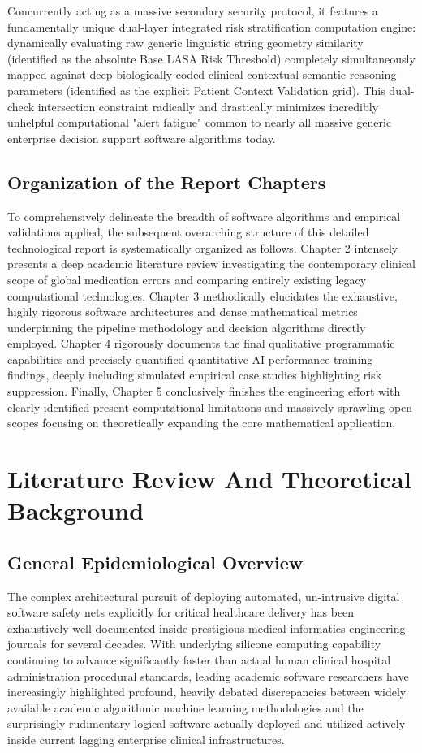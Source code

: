 \documentclass[12pt,a4paper]{report}
\begin{document}
Concurrently acting as a massive secondary security protocol, it features a fundamentally unique dual-layer integrated risk stratification computation engine: dynamically evaluating raw generic linguistic string geometry similarity (identified as the absolute Base LASA Risk Threshold) completely simultaneously mapped against deep biologically coded clinical contextual semantic reasoning parameters (identified as the explicit Patient Context Validation grid). This dual-check intersection constraint radically and drastically minimizes incredibly unhelpful computational "alert fatigue" common to nearly all massive generic enterprise decision support software algorithms today.

\section{Organization of the Report Chapters}
To comprehensively delineate the breadth of software algorithms and empirical validations applied, the subsequent overarching structure of this detailed technological report is systematically organized as follows. Chapter 2 intensely presents a deep academic literature review investigating the contemporary clinical scope of global medication errors and comparing entirely existing legacy computational technologies. Chapter 3 methodically elucidates the exhaustive, highly rigorous software architectures and dense mathematical metrics underpinning the pipeline methodology and decision algorithms directly employed. Chapter 4 rigorously documents the final qualitative programmatic capabilities and precisely quantified quantitative AI performance training findings, deeply including simulated empirical case studies highlighting risk suppression. Finally, Chapter 5 conclusively finishes the engineering effort with clearly identified present computational limitations and massively sprawling open scopes focusing on theoretically expanding the core mathematical application.

\chapter{Literature Review And Theoretical Background}

\section{General Epidemiological Overview}
The complex architectural pursuit of deploying automated, un-intrusive digital software safety nets explicitly for critical healthcare delivery has been exhaustively well documented inside prestigious medical informatics engineering journals for several decades. With underlying silicone computing capability continuing to advance significantly faster than actual human clinical hospital administration procedural standards, leading academic software researchers have increasingly highlighted profound, heavily debated discrepancies between widely available academic algorithmic machine learning methodologies and the surprisingly rudimentary logical software actually deployed and utilized actively inside current lagging enterprise clinical infrastructures.
\end{document}
